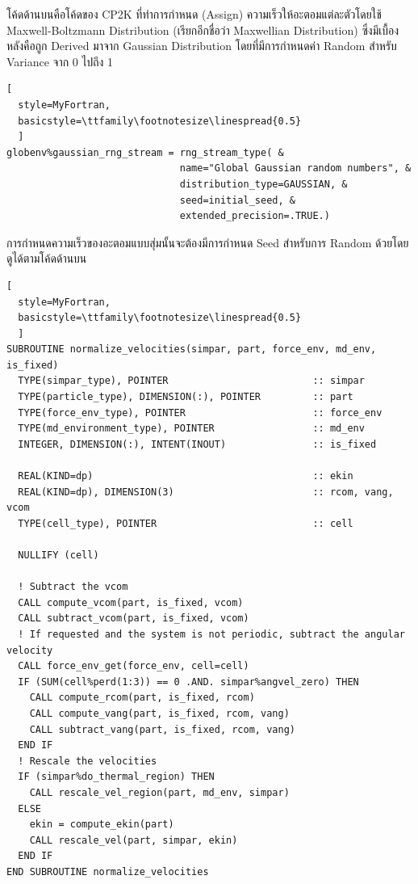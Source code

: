 \vspace{5pt}

โค้ดด้านบนคือโค้ดของ CP2K ที่ทำการกำหนด (Assign) ความเร็วให้อะตอมแต่ละตัวโดยใช้ Maxwell-Boltzmann Distribution
(เรียกอีกชื่อว่า Maxwellian Distribution) ซึ่งมีเบื้องหลังคือถูก Derived มาจาก Gaussian Distribution โดยที่มีการกำหนดค่า Random
สำหรับ Variance จาก 0 ไปถึง 1

\vspace{5pt}

\begin{lstlisting}[
  style=MyFortran,
  basicstyle=\ttfamily\footnotesize\linespread{0.5}
  ]
globenv%gaussian_rng_stream = rng_stream_type( &
                              name="Global Gaussian random numbers", &
                              distribution_type=GAUSSIAN, &
                              seed=initial_seed, &
                              extended_precision=.TRUE.)
\end{lstlisting}

\vspace{5pt}

\noindent การกำหนดความเร็วของอะตอมแบบสุ่มนั้นจะต้องมีการกำหนด Seed สำหรับการ Random ด้วยโดยดูได้ตามโค้ดด้านบน

\vspace{5pt}

\begin{lstlisting}[
  style=MyFortran,
  basicstyle=\ttfamily\footnotesize\linespread{0.5}
  ]
SUBROUTINE normalize_velocities(simpar, part, force_env, md_env, is_fixed)
  TYPE(simpar_type), POINTER                         :: simpar
  TYPE(particle_type), DIMENSION(:), POINTER         :: part
  TYPE(force_env_type), POINTER                      :: force_env
  TYPE(md_environment_type), POINTER                 :: md_env
  INTEGER, DIMENSION(:), INTENT(INOUT)               :: is_fixed

  REAL(KIND=dp)                                      :: ekin
  REAL(KIND=dp), DIMENSION(3)                        :: rcom, vang, vcom
  TYPE(cell_type), POINTER                           :: cell

  NULLIFY (cell)

  ! Subtract the vcom
  CALL compute_vcom(part, is_fixed, vcom)
  CALL subtract_vcom(part, is_fixed, vcom)
  ! If requested and the system is not periodic, subtract the angular velocity
  CALL force_env_get(force_env, cell=cell)
  IF (SUM(cell%perd(1:3)) == 0 .AND. simpar%angvel_zero) THEN
    CALL compute_rcom(part, is_fixed, rcom)
    CALL compute_vang(part, is_fixed, rcom, vang)
    CALL subtract_vang(part, is_fixed, rcom, vang)
  END IF
  ! Rescale the velocities
  IF (simpar%do_thermal_region) THEN
    CALL rescale_vel_region(part, md_env, simpar)
  ELSE
    ekin = compute_ekin(part)
    CALL rescale_vel(part, simpar, ekin)
  END IF
END SUBROUTINE normalize_velocities
\end{lstlisting}

